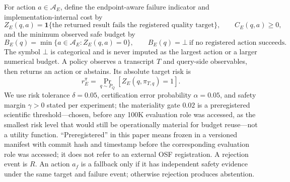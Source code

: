 \documentclass{article}
\renewcommand{\Pr}{\mathop{\mathrm{Pr}}}   %
\newcommand{\Acal}{\mathcal{A}}
\newcommand{\BOT}{\bot}
\begin{document}
For action $a\in\Acal_E$, define the endpoint-aware failure indicator and implementation-internal cost by
\begin{equation}
Z_{E}(q,a)=\mathbf{1}\{\text{the returned result fails the registered quality target}\},\qquad
C_{E}(q,a)\ge 0,
\label{eq:zc}
\end{equation}
and the minimum observed safe budget by
\begin{equation}
B_{E}(q)=\min\{a\in\Acal_{E}:Z_{E}(q,a)=0\},\qquad
B_{E}(q)=\BOT\ \text{if no registered action succeeds}.
\label{eq:bmin}
\end{equation}
The symbol $\BOT$ is categorical and is never imputed as the largest action or a larger numerical budget. A
policy observes a transcript $T$ and query-side observables, then returns an action or abstains. Its
absolute target risk is
\begin{equation}
r_{E}^{\pi}=\Pr_{q\sim P_{Q}}\!\left[Z_{E}(q,\pi_{T,q})=1\right].
\label{eq:risk}
\end{equation}
We use risk tolerance $\delta=0.05$, certification error probability $\alpha=0.05$, and safety margin
$\gamma>0$ stated per experiment; the materiality gate $0.02$ is a preregistered scientific threshold---chosen, before any 100K evaluation
role was accessed, as the smallest risk level that would still be operationally material for budget
reuse---not a utility function. ``Preregistered'' in this paper means frozen in a versioned manifest with commit hash and
timestamp before the corresponding evaluation role was accessed; it does not refer to an external OSF
registration. A rejection event is $R$. An action $a_f$ is a fallback only if it has independent safety
evidence under the same target and failure event; otherwise rejection produces abstention.
\end{document}
